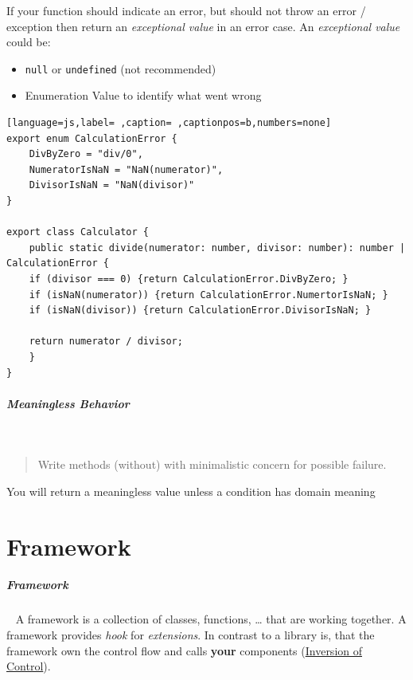 \documentclass[11pt,twoside,landscape]{article}
\begin{document}
\begin{multicols}{3}
If your function should indicate an error, but should not throw an error / exception then return an \emph{exceptional value} in an error case.
An \emph{exceptional value} could be:
\begin{itemize}
\item \texttt{null} or \texttt{undefined} (not recommended)
\item Enumeration Value to identify what went wrong
\end{itemize}


\begin{lstlisting}[language=js,label= ,caption= ,captionpos=b,numbers=none]
export enum CalculationError {
    DivByZero = "div/0",
    NumeratorIsNaN = "NaN(numerator)",
    DivisorIsNaN = "NaN(divisor)"
}

export class Calculator {
    public static divide(numerator: number, divisor: number): number | CalculationError {
	if (divisor === 0) {return CalculationError.DivByZero; }
	if (isNaN(numerator)) {return CalculationError.NumertorIsNaN; }
	if (isNaN(divisor)) {return CalculationError.DivisorIsNaN; }

	return numerator / divisor;
    }
}
\end{lstlisting}
\subparagraph{Meaningless Behavior} \
\label{sec:orge086c8b}
\begin{quote}
Write methods (without) with minimalistic concern for possible failure.
\end{quote}

You will return a meaningless value unless a condition has domain meaning
\section{Framework}
\label{sec:org53195d7}
\subparagraph{Framework} \
\label{sec:org0c5a98e}
A framework is a collection of classes, functions, \ldots{} that are working together.
A framework provides \emph{hook} for \emph{extensions}.
In contrast to a library is, that the framework own the control flow and calls \textbf{your} components (\href{../../../roam/20230102153338-what_is_inversion_of_control.org}{Inversion of Control}).



\end{multicols}
\end{document}
